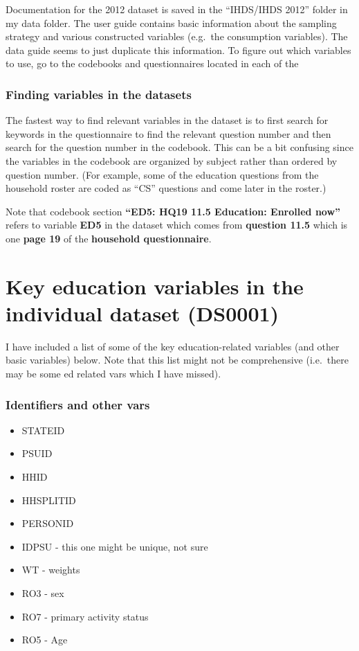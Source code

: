 \documentclass[
]{article}
\providecommand{\tightlist}{%
  \setlength{\itemsep}{0pt}\setlength{\parskip}{0pt}}
\begin{document}
Documentation for the 2012 dataset is saved in the ``IHDS/IHDS 2012''
folder in my data folder. The user guide contains basic information
about the sampling strategy and various constructed variables (e.g.~the
consumption variables). The data guide seems to just duplicate this
information. To figure out which variables to use, go to the codebooks
and questionnaires located in each of the

\hypertarget{finding-variables-in-the-datasets}{%
\subsubsection{Finding variables in the
datasets}\label{finding-variables-in-the-datasets}}

The fastest way to find relevant variables in the dataset is to first
search for keywords in the questionnaire to find the relevant question
number and then search for the question number in the codebook. This can
be a bit confusing since the variables in the codebook are organized by
subject rather than ordered by question number. (For example, some of
the education questions from the household roster are coded as ``CS''
questions and come later in the roster.)

Note that codebook section \textbf{``ED5: HQ19 11.5 Education: Enrolled
now''} refers to variable \textbf{ED5} in the dataset which comes from
\textbf{question 11.5} which is one \textbf{page 19} of the
\textbf{household questionnaire}.

\hypertarget{key-education-variables-in-the-individual-dataset-ds0001}{%
\section{Key education variables in the individual dataset
(DS0001)}\label{key-education-variables-in-the-individual-dataset-ds0001}}

I have included a list of some of the key education-related variables
(and other basic variables) below. Note that this list might not be
comprehensive (i.e.~there may be some ed related vars which I have
missed).

\hypertarget{identifiers-and-other-vars}{%
\subsubsection{Identifiers and other
vars}\label{identifiers-and-other-vars}}

\begin{itemize}
\tightlist
\item
  STATEID
\item
  PSUID
\item
  HHID
\item
  HHSPLITID
\item
  PERSONID
\item
  IDPSU - this one might be unique, not sure
\item
  WT - weights
\item
  RO3 - sex
\item
  RO7 - primary activity status
\item
  RO5 - Age
\end{itemize}
\end{document}
